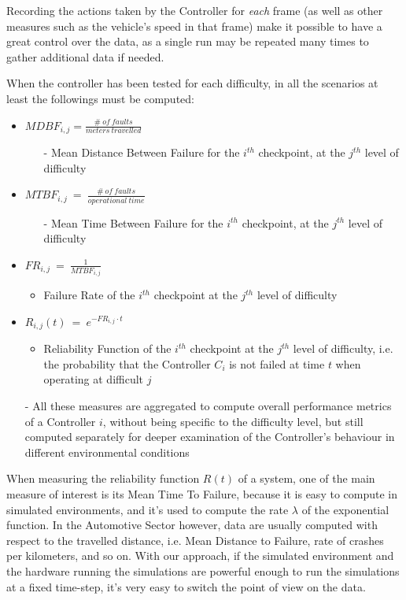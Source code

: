 Recording the actions taken by the Controller for \textsl{each} frame (as well as other measures such as the vehicle's speed in that frame) make it possible to have a great control over the data, as a single run may be repeated many times to gather additional data if needed.

When the controller has been tested for each difficulty, in all the scenarios at least the followings must be computed:

\begin{itemize}
	\item $MDBF_{i,j} = \frac{\#\: of\: faults}{meters\: travelled}$
	\begin{itemize}
		\item[-] Mean Distance Between Failure for the $i^{th}$ checkpoint, at the $j^{th}$ level of difficulty
	\end{itemize}
	\item $MTBF_{i,j}\: =\: \frac{\#\: of\: faults}{operational\: time}$
		\begin{itemize}
		\item[-] Mean Time Between Failure for the $i^{th}$ checkpoint, at the $j^{th}$ level of difficulty
	\end{itemize}
	\item $FR_{i,j}\: =\: \frac{1}{MTBF_{i,j}}$
	\begin{itemize}
		\item Failure Rate of the $i^{th}$ checkpoint at the $j^{th}$ level of difficulty
	\end{itemize}
	\item $R_{i,j}(t)\: =\: e^{-FR_{i,j}\cdot t}$
	\begin{itemize}
		\item Reliability Function of the $i^{th}$ checkpoint at the $j^{th}$ level of difficulty, i.e. the probability that the Controller $C_{i}$ is not failed at time $t$ when operating at difficult $j$
	\end{itemize}
	
	\item[-] All these measures are aggregated to compute overall performance metrics of a Controller $i$, without being specific to the difficulty level, but still computed separately for deeper examination of the Controller's behaviour in different environmental conditions
	
\end{itemize}

When measuring the reliability function $R(t)$ of a system, one of the main measure of interest is its Mean Time To Failure, because it is easy to compute in simulated environments, and it's used to compute the rate $\lambda$ of the exponential function.
In the Automotive Sector however, data are usually computed with respect to the travelled distance, i.e. Mean Distance to Failure, rate of crashes per kilometers, and so on.
With our approach, if the simulated environment and the hardware running the simulations are powerful enough to run the simulations at a fixed time-step, it's very easy to switch the point of view on the data.

